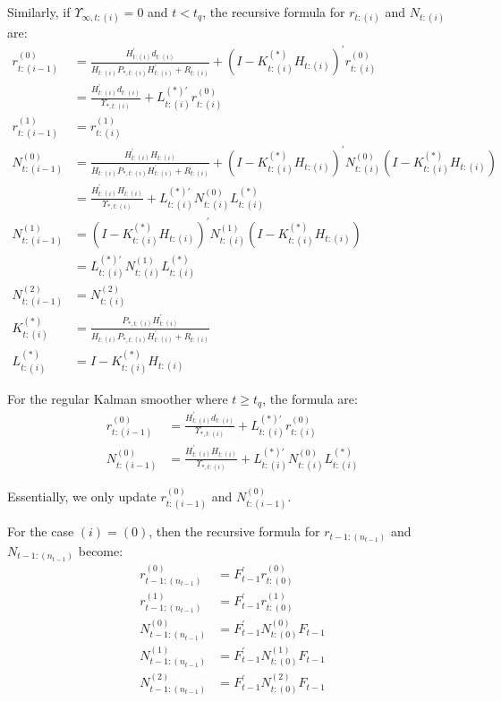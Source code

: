 \documentclass[10pt]{article}
\numberwithin{equation}{section}
\begin{document}
Similarly, if $\Upsilon_{\infty,t:(i)}=0$ and $t<t_q$, the recursive formula for $r_{t:(i)}$ and $N_{t:(i)}$ are:
\begin{align}
    r_{t:(i-1)}^{(0)} &= \frac{H_{t:(i)}^{'}d_{t:(i)}}{H_{t:(i)}P_{*,t:(i)}H_{t:(i)}^{'}+R_{t:(i)}} + (I-K_{t:(i)}^{(*)}H_{t:(i)})^{'}r_{t:(i)}^{(0)} \nonumber \\
    &= \frac{H_{t:(i)}^{'}d_{t:(i)}}{\Upsilon_{*,t:(i)}} + L_{t:(i)}^{(*)'}r_{t:(i)}^{(0)} \\
    r_{t:(i-1)}^{(1)} &= r_{t:(i)}^{(1)} \\ 
    N_{t:(i-1)}^{(0)} &= \frac{H_{t:(i)}^{'}H_{t:(i)}}{H_{t:(i)}P_{*,t:(i)}H_{t:(i)}^{'}+R_{t:(i)}}+(I-K_{t:(i)}^{(*)}H_{t:(i)})^{'}N_{t:(i)}^{(0)}(I-K_{t:(i)}^{(*)}H_{t:(i)}) \nonumber \\
    &= \frac{H_{t:(i)}^{'}H_{t:(i)}}{\Upsilon_{*,t:(i)}} + L_{t:(i)}^{(*)'}N_{t:(i)}^{(0)}L_{t:(i)}^{(*)} \\
    N_{t:(i-1)}^{(1)} &= (I-K_{t:(i)}^{(*)}H_{t:(i)})^{'}N_{t:(i)}^{(1)}(I-K_{t:(i)}^{(*)}H_{t:(i)}) \nonumber \\
    &= L_{t:(i)}^{(*)'}N_{t:(i)}^{(1)}L_{t:(i)}^{(*)} \\
    N_{t:(i-1)}^{(2)} &= N_{t:(i)}^{(2)} \\
    K_{t:(i)}^{(*)} &= \frac{P_{*,t:(i)}H_{t:(i)}^{'}}{H_{t:(i)}P_{*,t:(i)}H_{t:(i)}^{'}+R_{t:(i)}} \\
    L_{t:(i)}^{(*)} &= I - K_{t:(i)}^{(*)}H_{t:(i)}
\end{align}

For the regular Kalman smoother where $t\geq t_q$, the formula are: 
\begin{align}
    r_{t:(i-1)}^{(0)} &= \frac{H_{t:(i)}^{'}d_{t:(i)}}{\Upsilon_{*,t:(i)}} + L_{t:(i)}^{(*)'}r_{t:(i)}^{(0)} \\
    N_{t:(i-1)}^{(0)} &= \frac{H_{t:(i)}^{'}H_{t:(i)}}{\Upsilon_{*,t:(i)}} + L_{t:(i)}^{(*)'}N_{t:(i)}^{(0)}L_{t:(i)}^{(*)} 
\end{align}

Essentially, we only update $r_{t:(i-1)}^{(0)}$ and $N_{t:(i-1)}^{(0)}$. 

For the case $(i)=(0)$, then the recursive formula for $r_{t-1:(n_{t-1})}$ and $N_{t-1:(n_{t-1})}$ become:
\begin{align}
    r_{t-1:(n_{t-1})}^{(0)} &= F_{t-1}^{'}r_{t:(0)}^{(0)} \\
    r_{t-1:(n_{t-1})}^{(1)} &= F_{t-1}^{'}r_{t:(0)}^{(1)} \\
    N_{t-1:(n_{t-1})}^{(0)} &= F_{t-1}^{'}N_{t:(0)}^{(0)}F_{t-1} \\
    N_{t-1:(n_{t-1})}^{(1)} &= F_{t-1}^{'}N_{t:(0)}^{(1)}F_{t-1} \\
    N_{t-1:(n_{t-1})}^{(2)} &= F_{t-1}^{'}N_{t:(0)}^{(2)}F_{t-1} \label{eq:diff_uni_end}
\end{align}
\end{document}
